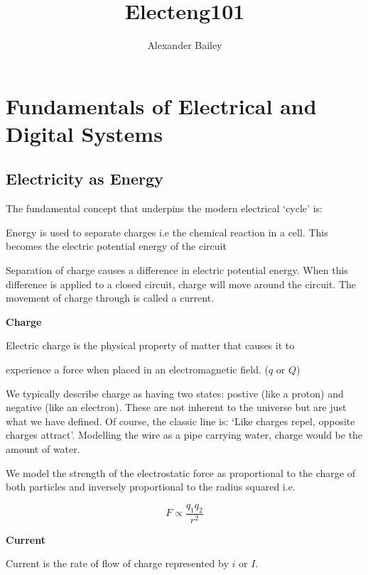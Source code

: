 \documentclass[12pt]{article}
\begin{document}
\setlength{\parskip}{\baselineskip}%

\title{Electeng101}
\author{Alexander Bailey}
\maketitle
\flushbottom

\section{Fundamentals of Electrical and Digital Systems}
\subsection{Electricity as Energy}
The fundamental concept that underpins the modern electrical `cycle' is: 
\begin{definition*}
  Energy is used to separate charges i.e the chemical reaction in a cell. This becomes the electric potential energy of the circuit
\end{definition*}

Separation of charge causes a difference in electric potential energy.
When this difference is applied to a closed circuit, charge will move around the circuit.
The movement of charge through is called a current. 

\textbf{Charge}
\begin{definition*}
  Electric charge is the physical property of matter that causes it to 

  experience a force when placed in an electromagnetic field. ($q$ or $Q$)
\end{definition*}

We typically describe charge as having two states: postive (like a proton) and negative (like an electron).
These are not inherent to the universe but are just what we have defined.
Of course, the classic line is: `Like charges repel, opposite charges attract'.
Modelling the wire as a pipe carrying water, charge would be the amount of water. 

We model the strength of the electrostatic force as proportional to the charge of both particles and inversely proportional to the radius squared i.e. 

\begin{equation*}
  F \propto \frac{q_1q_2}{r^2}
\end{equation*}

\textbf{Current}
\begin{definition*}
   Current is the rate of flow of charge represented by $i$ or $I$.
\end{definition*}
\end{document}
